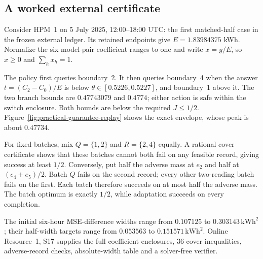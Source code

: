 \subsection{A worked external certificate}
\label{sec:worked-joint-certificate}
Consider HPM~1 on 5 July 2025, 12:00--18:00 UTC: the first matched-half
case in the frozen external ledger. Its retained endpoints give
$E=1.83984375$ kWh. Normalize the six model-pair coefficient ranges to one
and write $x=y/E$, so $x\geq0$ and $\sum_hx_h=1$.

The policy first queries boundary~2. It then queries boundary~4 when the
answer $t=(C_2-C_0)/E$ is below $\theta\in[0.5226,0.5227]$, and boundary~1
above it. The two branch bounds are $0.47743079$ and $0.4774$; either action
is safe within the switch enclosure. Both bounds are below the required
$J\leq1/2$. Figure~\ref{fig:practical-guarantee-replay} shows the exact
envelope, whose peak is about $0.47734$.

For fixed batches, mix $Q=\{1,2\}$ and $R=\{2,4\}$ equally. A rational
cover certificate shows that these batches cannot both fail on any feasible
record, giving success at least $1/2$. Conversely, put half the adverse mass
at $e_2$ and half at $(e_4+e_5)/2$. Batch $Q$ fails on the second record;
every other two-reading batch fails on the first. Each batch therefore
succeeds on at most half the adverse mass. The batch optimum is exactly
$1/2$, while adaptation succeeds on every completion.

The initial six-hour MSE-difference widths range from $0.107125$ to
$0.303143\,\mathrm{kWh}^2$; their half-width targets range from $0.053563$
to $0.151571\,\mathrm{kWh}^2$. Online Resource~1, S17 supplies the full
coefficient enclosures, 36 cover inequalities, adverse-record checks,
absolute-width table and a solver-free verifier.
